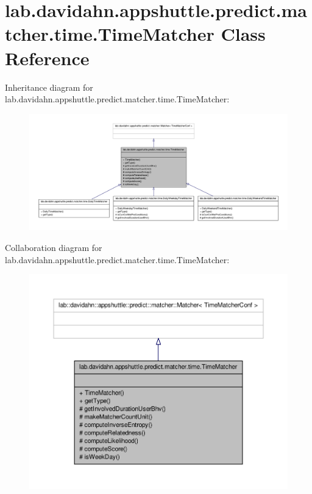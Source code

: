 \hypertarget{classlab_1_1davidahn_1_1appshuttle_1_1predict_1_1matcher_1_1time_1_1_time_matcher}{\section{lab.\-davidahn.\-appshuttle.\-predict.\-matcher.\-time.\-Time\-Matcher \-Class \-Reference}
\label{classlab_1_1davidahn_1_1appshuttle_1_1predict_1_1matcher_1_1time_1_1_time_matcher}
}


\-Inheritance diagram for lab.\-davidahn.\-appshuttle.\-predict.\-matcher.\-time.\-Time\-Matcher\-:
\nopagebreak
\begin{figure}[H]
\begin{center}
\leavevmode
\includegraphics[width=350pt]{classlab_1_1davidahn_1_1appshuttle_1_1predict_1_1matcher_1_1time_1_1_time_matcher__inherit__graph}
\end{center}
\end{figure}


\-Collaboration diagram for lab.\-davidahn.\-appshuttle.\-predict.\-matcher.\-time.\-Time\-Matcher\-:
\nopagebreak
\begin{figure}[H]
\begin{center}
\leavevmode
\includegraphics[width=350pt]{classlab_1_1davidahn_1_1appshuttle_1_1predict_1_1matcher_1_1time_1_1_time_matcher__coll__graph}
\end{center}
\end{figure}
